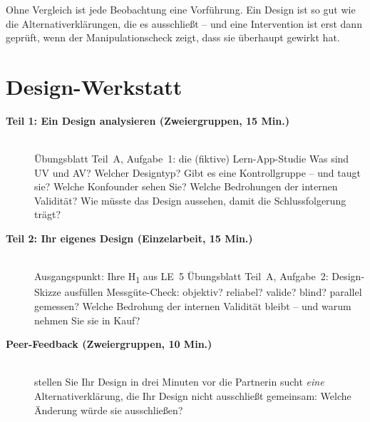 \begin{merkbox}
Ohne Vergleich ist jede Beobachtung eine Vorführung. Ein Design ist so
gut wie die Alternativerklärungen, die es ausschließt -- und eine
Intervention ist erst dann geprüft, wenn der Manipulationscheck zeigt,
dass sie überhaupt gewirkt hat.
\end{merkbox}
\os{\newpage}

\section{Design-Werkstatt}
\begin{description}
\item[{\rot\bf Teil 1: Ein Design analysieren (Zweiergruppen, 15 Min.)}]~\\[-\lblskip]
\bi
  \ite Übungsblatt Teil~A, Aufgabe~1: die (fiktive) Lern-App-Studie
  \ite Was sind UV und AV? Welcher Designtyp?
  \ite Gibt es eine Kontrollgruppe -- und taugt sie?
  \ite Welche Konfounder sehen Sie? Welche Bedrohungen der internen
    Validität?
  \ite Wie müsste das Design aussehen, damit die Schlussfolgerung trägt?
\ei
\os{\newpage}

\item[{\rot\bf Teil 2: Ihr eigenes Design (Einzelarbeit, 15 Min.)}]~\\[-\lblskip]
\bi
  \ite Ausgangspunkt: Ihre H\textsubscript{1} aus LE~5
  \ite Übungsblatt Teil~A, Aufgabe~2: Design-Skizze ausfüllen
  \ite Messgüte-Check: objektiv? reliabel? valide? blind? parallel
    gemessen?
  \ite Welche Bedrohung der internen Validität bleibt -- und warum
    nehmen Sie sie in Kauf?
\ei
\os{\newpage}

\item[{\rot\bf Peer-Feedback (Zweiergruppen, 10 Min.)}]~\\[-\lblskip]
\bi
  \ite stellen Sie Ihr Design in drei Minuten vor
  \ite die Partnerin sucht \emph{eine} Alternativerklärung, die Ihr
    Design nicht ausschließt
  \ite gemeinsam: Welche Änderung würde sie ausschließen?
\ei
\os{\newpage}
\end{description}


